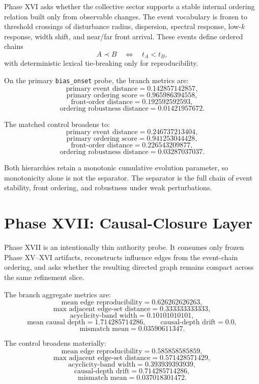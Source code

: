 \documentclass[11pt]{article}
\begin{document}
Phase XVI asks whether the collective sector supports a stable internal ordering relation built only from observable changes. The event vocabulary is frozen to threshold crossings of disturbance radius, dispersion, spectral response, low-$k$ response, width shift, and near/far front arrival. These events define ordered chains
\[
A \prec B \quad \Leftrightarrow \quad t_A < t_B,
\]
with deterministic lexical tie-breaking only for reproducibility.

On the primary \texttt{bias\_onset} probe, the branch metrics are:
\[
\text{primary event distance} = 0.142857142857,
\]
\[
\text{primary ordering score} = 0.965986394558,
\]
\[
\text{front-order distance} = 0.192592592593,
\]
\[
\text{ordering robustness distance} = 0.01421957672.
\]

The matched control broadens to:
\[
\text{primary event distance} = 0.246737213404,
\]
\[
\text{primary ordering score} = 0.941253044428,
\]
\[
\text{front-order distance} = 0.226543209877,
\]
\[
\text{ordering robustness distance} = 0.03287037037.
\]

Both hierarchies retain a monotonic cumulative evolution parameter, so monotonicity alone is not the separator. The separator is the full chain of event stability, front ordering, and robustness under weak perturbations.

\section{Phase XVII: Causal-Closure Layer}

Phase XVII is an intentionally thin authority probe. It consumes only frozen Phase XV--XVI artifacts, reconstructs influence edges from the event-chain ordering, and asks whether the resulting directed graph remains compact across the same refinement slice.

The branch aggregate metrics are:
\[
\text{mean edge reproducibility} = 0.626262626263,
\]
\[
\text{max adjacent edge-set distance} = 0.333333333333,
\]
\[
\text{acyclicity-band width} = 0.10101010101,
\]
\[
\text{mean causal depth} = 1.714285714286,
\qquad
\text{causal-depth drift} = 0.0,
\]
\[
\text{mismatch mean} = 0.03590611347.
\]

The control broadens materially:
\[
\text{mean edge reproducibility} = 0.585858585859,
\]
\[
\text{max adjacent edge-set distance} = 0.571428571429,
\]
\[
\text{acyclicity-band width} = 0.393939393939,
\]
\[
\text{causal-depth drift} = 0.714285714286,
\]
\[
\text{mismatch mean} = 0.037018301472.
\]
\end{document}
